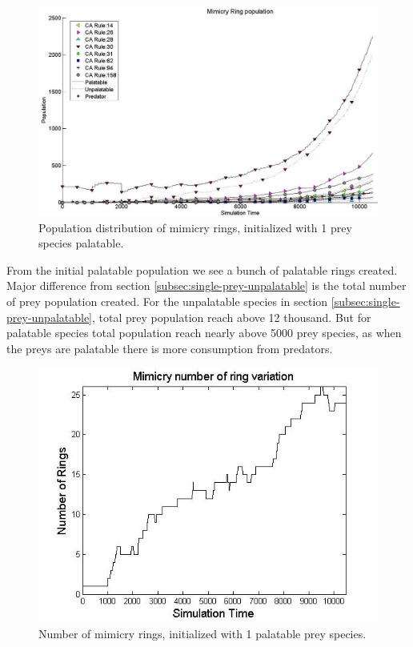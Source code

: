 \begin{figure}[H]
	\centering
	\includegraphics[scale=0.45]{images/simTime10k-1Prey-p}
	\caption[Population distribution of mimicry rings (1 prey species palatable)]{Population distribution of mimicry rings, initialized with 1 prey species palatable.}
	\label{fig:plot-1-prey-p}
\end{figure}

From the initial palatable population we see a bunch of palatable rings created. Major difference from section \ref{subsec:single-prey-unpalatable} is the total number of prey population created. For the unpalatable species in section \ref{subsec:single-prey-unpalatable}, total prey population reach above 12 thousand. But for palatable species total population reach nearly above 5000 prey species, as when the preys are palatable there is more consumption from predators. 

\begin{figure}[H]
	\centering
	\includegraphics[scale=0.50]{images/ringSize10k-1Prey-p}
	\caption[Number of mimicry rings (1 palatable prey species)]{Number of mimicry rings, initialized with 1 palatable prey species.}
	\label{fig:ringSize8k-1-Prey-p}
\end{figure}


